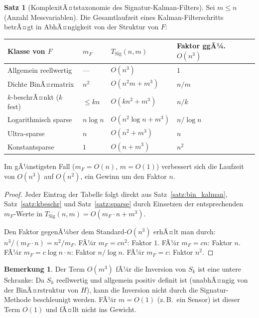 ﻿\documentclass[a4paper,12pt]{article}
\theoremstyle{definition}
\newtheorem{satz}{Satz}
\newtheorem{bemerkung}{Bemerkung}
\begin{document}
\begin{satz}[KomplexitÃ¤tstaxonomie des Signatur-Kalman-Filters]
\label{satz:taxonomie}
    Sei $m \leq n$ (Anzahl Messvariablen). Die Gesamtlaufzeit eines
    Kalman-Filterschritts betrÃ¤gt in AbhÃ¤ngigkeit von der Struktur von $F$:

    \begin{center}
    \begin{tabular}{llll}
    \toprule
    Klasse von $F$ & $m_F$ & $T_{\mathrm{Sig}}(n,m)$ & Faktor ggÃ¼.\ $O(n^3)$ \\
    \midrule
    Allgemein reellwertig & --- & $O(n^3)$ & $1$ \\
    Dichte BinÃ¤rmatrix & $n^2$ & $O(n^2 m + m^3)$ & $n/m$ \\
    $k$-beschrÃ¤nkt ($k$ fest) & $\leq kn$ & $O(k n^2 + m^3)$ & $n/k$ \\
    Logarithmisch sparse & $n \log n$ & $O(n^2 \log n + m^3)$ & $n/\log n$ \\
    Ultra-sparse & $n$ & $O(n^2 + m^3)$ & $n$ \\
    Konstantsparse & $1$ & $O(n + m^3)$ & $n^2$ \\
    \bottomrule
    \end{tabular}
    \end{center}
    Im gÃ¼nstigsten Fall ($m_F = O(n)$, $m = O(1)$) verbessert sich die
    Laufzeit von $O(n^3)$ auf $O(n^2)$, ein Gewinn um den Faktor $n$.
\end{satz}

\begin{proof}
Jeder Eintrag der Tabelle folgt direkt aus Satz~\ref{satz:bin_kalman},
Satz~\ref{satz:kbeschr} und Satz~\ref{satz:sparse} durch Einsetzen der
entsprechenden $m_F$-Werte in $T_{\mathrm{Sig}}(n,m) = O(m_F \cdot n + m^3)$.

Den Faktor gegenÃ¼ber dem Standard-$O(n^3)$ erhÃ¤lt man durch:
$n^3 / (m_F \cdot n) = n^2 / m_F$.
FÃ¼r $m_F = cn^2$: Faktor $1$.
FÃ¼r $m_F = cn$: Faktor $n$.
FÃ¼r $m_F = c\log n \cdot n$: Faktor $n/\log n$.
FÃ¼r $m_F = c$: Faktor $n^2$.
\end{proof}

\begin{bemerkung}
    Der Term $O(m^3)$ fÃ¼r die Inversion von $S_k$ ist eine untere Schranke:
    Da $S_k$ reellwertig und allgemein positiv definit ist (unabhÃ¤ngig von
    der BinÃ¤rstruktur von $H$), kann die Inversion nicht durch die
    Signatur-Methode beschleunigt werden. FÃ¼r $m = O(1)$ (z.\,B.\ ein Sensor)
    ist dieser Term $O(1)$ und fÃ¤llt nicht ins Gewicht.
\end{bemerkung}
\end{document}
